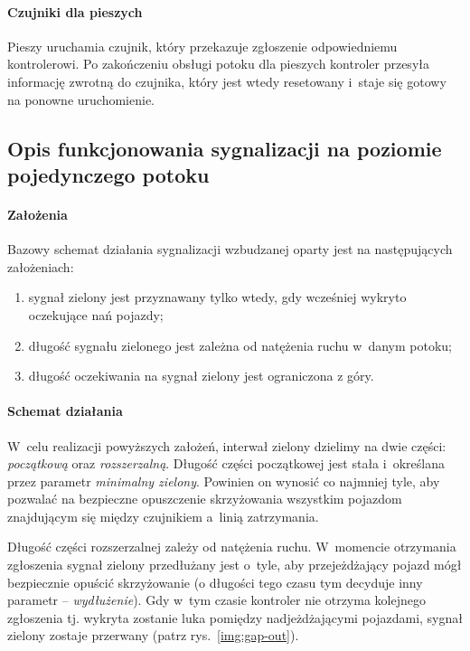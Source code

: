 \documentclass{pracamgr}
\newcommand{\imgr}[1]{rys.~\ref{#1}}
\theoremstyle{plain}
\begin{document}
\paragraph{Czujniki dla pieszych} Pieszy uruchamia czujnik, który
przekazuje zgłoszenie odpowiedniemu kontrolerowi. Po zakończeniu
obsługi potoku dla pieszych kontroler przesyła informację zwrotną do
czujnika, który jest wtedy resetowany i~staje się gotowy na ponowne
uruchomienie.

\subsection{Opis funkcjonowania sygnalizacji na poziomie pojedynczego
potoku}
\label{ss:schemat}

\paragraph{Założenia} Bazowy schemat działania sygnalizacji wzbudzanej
oparty jest na następujących założeniach:
\begin{enumerate}
  \item sygnał zielony jest przyznawany tylko wtedy, gdy wcześniej
  wykryto oczekujące nań pojazdy;
  \item długość sygnału zielonego jest zależna od natężenia ruchu
  w~danym potoku;
  \item długość oczekiwania na sygnał zielony jest ograniczona z góry.
\end{enumerate}

\paragraph{Schemat działania} W~celu realizacji powyższych założeń,
interwał zielony dzielimy na dwie części: \emph{początkową} oraz
\emph{rozszerzalną}. Długość części początkowej jest stała i~określana
przez parametr \emph{minimalny zielony}. Powinien on wynosić co
najmniej tyle, aby pozwalać na bezpieczne opuszczenie skrzyżowania
wszystkim pojazdom znajdującym się między czujnikiem a~linią
zatrzymania.

Długość części rozszerzalnej zależy od natężenia ruchu. W~momencie
otrzymania zgłoszenia sygnał zielony przedłużany jest o~tyle, aby
przejeżdżający pojazd mógł bezpiecznie opuścić skrzyżowanie (o
długości tego czasu tym decyduje inny parametr --
\emph{wydłużenie}). Gdy w~tym czasie kontroler nie otrzyma kolejnego
zgłoszenia tj. wykryta zostanie luka pomiędzy nadjeżdżającymi
pojazdami, sygnał zielony zostaje przerwany (patrz
\imgr{img:gap-out}).
\end{document}
